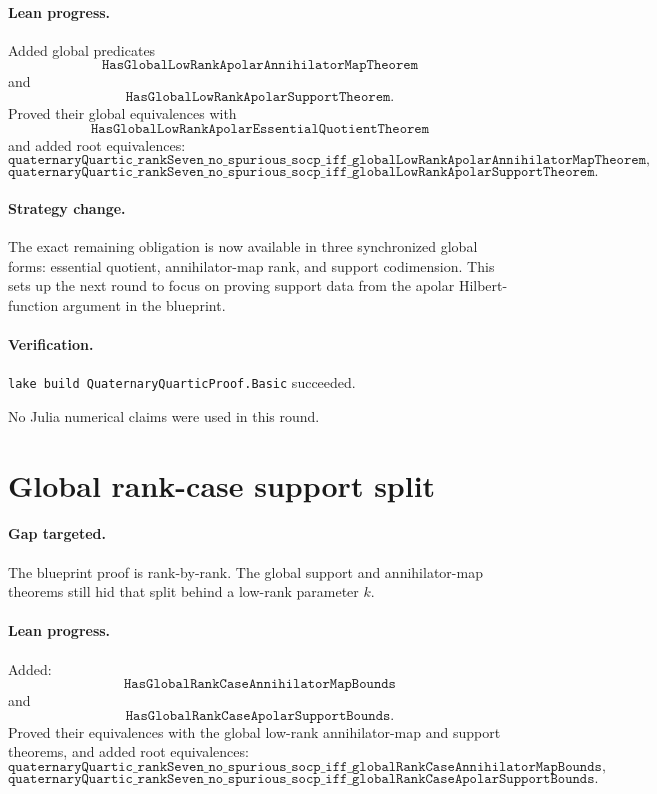 \documentclass[11pt]{article}
\begin{document}
\paragraph{Lean progress.}
Added global predicates
\[
\texttt{HasGlobalLowRankApolarAnnihilatorMapTheorem}
\]
and
\[
\texttt{HasGlobalLowRankApolarSupportTheorem}.
\]
Proved their global equivalences with
\[
\texttt{HasGlobalLowRankApolarEssentialQuotientTheorem}
\]
and added root equivalences:
\[
\texttt{quaternaryQuartic\_rankSeven\_no\_spurious\_socp\_iff\_globalLowRankApolarAnnihilatorMapTheorem},
\]
\[
\texttt{quaternaryQuartic\_rankSeven\_no\_spurious\_socp\_iff\_globalLowRankApolarSupportTheorem}.
\]

\paragraph{Strategy change.}
The exact remaining obligation is now available in three synchronized global
forms: essential quotient, annihilator-map rank, and support codimension.  This
sets up the next round to focus on proving support data from the apolar
Hilbert-function argument in the blueprint.

\paragraph{Verification.}
\texttt{lake build QuaternaryQuarticProof.Basic} succeeded.

No Julia numerical claims were used in this round.

\section*{Global rank-case support split}

\paragraph{Gap targeted.}
The blueprint proof is rank-by-rank.  The global support and annihilator-map
theorems still hid that split behind a low-rank parameter \(k\).

\paragraph{Lean progress.}
Added:
\[
\texttt{HasGlobalRankCaseAnnihilatorMapBounds}
\]
and
\[
\texttt{HasGlobalRankCaseApolarSupportBounds}.
\]
Proved their equivalences with the global low-rank annihilator-map and support
theorems, and added root equivalences:
\[
\texttt{quaternaryQuartic\_rankSeven\_no\_spurious\_socp\_iff\_globalRankCaseAnnihilatorMapBounds},
\]
\[
\texttt{quaternaryQuartic\_rankSeven\_no\_spurious\_socp\_iff\_globalRankCaseApolarSupportBounds}.
\]
\end{document}
